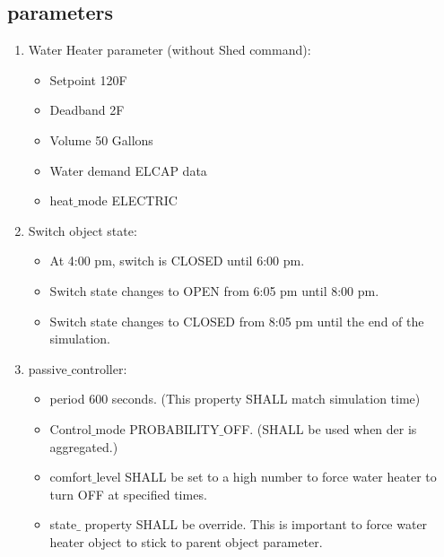 \subsection{parameters}
    \begin{enumerate}
        \item Water Heater parameter (without Shed command):
        \begin{itemize}
        \item Setpoint 120F
        \item Deadband 2F
        \item Volume 50 Gallons
        \item Water demand ELCAP data
        \item heat$\_$mode ELECTRIC
        \end{itemize}
        \item Switch object state:
            \begin{itemize}
                \item At 4:00 pm, switch is CLOSED until 6:00 pm.
                \item Switch state changes to OPEN from 6:05 pm until 8:00 pm.
                \item Switch state changes to CLOSED from 8:05 pm until the end of the simulation.
            \end{itemize}
        \item passive$\_$controller:
            \begin{itemize}
                \item period 600 seconds. (This property SHALL match simulation time)
                \item Control$\_$mode PROBABILITY$\_$OFF. (SHALL be used when der is aggregated.)
                \item comfort$\_$level SHALL be set to a high number to force water heater to turn OFF at specified times.
                \item state$\_$ property SHALL be override. This is important to force water heater object to stick to parent object parameter.
            \end{itemize}
    \end{enumerate}
